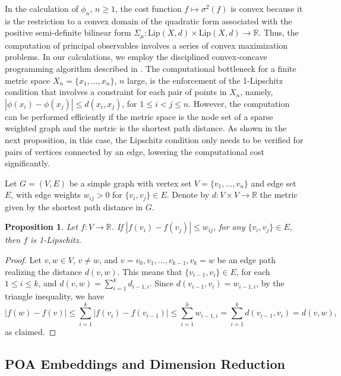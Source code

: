 \documentclass[11pt]{article}
\newtheorem{proposition}[theorem]{Proposition}
\theoremstyle{definition}
\newcommand{\real}{\ensuremath{\mathbb{R}}}
\newcommand{\lip}{\ensuremath{\text{Lip}}}
\begin{document}
In the calculation of $\phi_n$, $n \geq 1$, the cost function $f \mapsto \sigma^2 (f)$ is convex because it is the restriction to a convex domain of the quadratic form associated with the positive semi-definite bilinear form $\Sigma_\mu \colon \lip (X,d) \times \lip (X,d) \to \real$. Thus, the computation of principal observables involves a series of convex maximization problems. In our calculations, we employ the disciplined convex-concave programming algorithm described in \cite{shen2016disciplined}. The computational bottleneck for a finite metric space $X_n=\{x_1, \ldots, x_n\}$, $n$ large, is the enforcement of the 1-Lipschitz condition that involves a constraint for each pair of points in $X_n$, namely, $|\phi(x_i)-\phi(x_j)| \leq d(x_i,x_j)$, for $1 \leq i < j \leq n$. However, the computation can be performed efficiently if the metric space is the node set of a sparse weighted graph and the metric is the shortest path distance. As shown in the next proposition, in this case, the Lipschitz condition only needs to be verified for pairs of vertices connected by an edge, lowering the computational cost significantly.

Let $G=(V,E)$ be a simple graph with vertex set $V = \{v_1, \ldots, v_n\}$ and edge set $E$, with edge weights $w_{ij}>0$ for $\{v_i,v_j\} \in E$. Denote by $d \colon V \times V \to \real$ the metric given by the shortest path distance in $G$.

\begin{proposition}
Let $f \colon V \to \real$. If $|f(v_i)-f(v_j)| \leq w_{ij}$, for any $\{v_i,v_j\} \in E$, then $f$ is 1-Lipschitz.
\end{proposition}

\begin{proof}
Let $v,w \in V$, $v \ne w$, and $v=v_0 , v_1, \ldots, v_{k-1}, v_k = w$ be an edge path realizing the distance $d(v,w)$. This means that $\{v_{i-1}, v_i\} \in E$, for each $1\leq i \leq k$, and $d(v,w) = \sum_{i=1}^k d_{i-1,i}$. Since $d(v_{i-1}, v_i) = w_{i-1,i}$, by the triangle inequality, we have 
\begin{equation}
|f(w)-f(v)| \leq \sum_{i=1}^k |f(v_i)-f(v_{i-1})| \leq \sum_{i=1}^k w_{i-1,i} = \sum_{i=1}^k d(v_{i-1},v_i) = d(v,w),
\end{equation}
as claimed.
\end{proof}

\subsection{POA Embeddings and Dimension Reduction}
\end{document}
